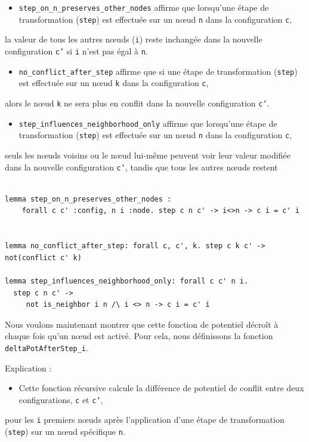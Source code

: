 \documentclass[11pt]{article}
\begin{document}
\begin{itemize}
\item \texttt{step\_on\_n\_preserves\_other\_nodes} affirme que lorsqu'une étape de transformation (\texttt{step}) est effectuée sur un nœud \texttt{n} dans la configuration \texttt{c},
\end{itemize}
la valeur de tous les autres nœuds (\texttt{i}) reste inchangée dans la nouvelle configuration \texttt{c'} si \texttt{i} n'est pas égal à \texttt{n}.

\begin{itemize}
\item \texttt{no\_conflict\_after\_step} affirme que si une étape de transformation (\texttt{step}) est effectuée sur un nœud \texttt{k} dans la configuration \texttt{c},
\end{itemize}
alors le nœud \texttt{k} ne sera plus en conflit dans la nouvelle configuration \texttt{c'}.

\begin{itemize}
\item \texttt{step\_influences\_neighborhood\_only} affirme que lorsqu'une étape de transformation (\texttt{step}) est effectuée sur un nœud \texttt{n} dans la configuration \texttt{c},
\end{itemize}
seuls les nœuds voisins ou le nœud lui-même peuvent voir leur valeur modifiée dans la nouvelle configuration \texttt{c'}, tandis que tous les autres nœuds restent 
\lstset{language=why3,label= ,caption= ,captionpos=b,numbers=none}
\begin{lstlisting}

lemma step_on_n_preserves_other_nodes :
    forall c c' :config, n i :node. step c n c' -> i<>n -> c i = c' i


lemma no_conflict_after_step: forall c, c', k. step c k c' -> not(conflict c' k)

lemma step_influences_neighborhood_only: forall c c' n i.
  step c n c' ->
     not is_neighbor i n /\ i <> n -> c i = c' i

\end{lstlisting}


Nous voulons maintenant montrer que cette fonction de potentiel décroît à chaque fois qu'un nœud est activé. Pour cela, nous définissons la fonction \texttt{deltaPotAfterStep\_i}.

Explication :

\begin{itemize}
\item Cette fonction récursive calcule la différence de potentiel de conflit entre deux configurations, \texttt{c} et \texttt{c'},
\end{itemize}
pour les \texttt{i} premiers nœuds après l'application d'une étape de transformation (\texttt{step}) sur un nœud spécifique \texttt{n}.
\end{document}
